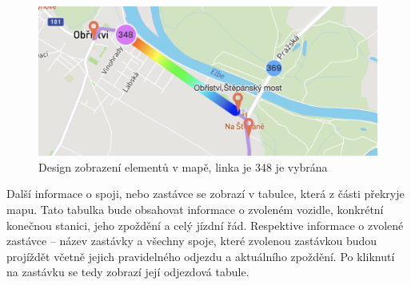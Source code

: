 \begin{figure}
\centering
  \includegraphics[width=0.5\linewidth]{../img/dve_vozidla.png}
  \caption{Design zobrazení elementů v mapě, linka je 348 je vybrána}
  \label{fig:dve_vozidla}
\end{figure}


Další informace o spoji, nebo zastávce se zobrazí v tabulce, která z části překryje mapu. Tato tabulka bude obsahovat informace o zvoleném vozidle, konkrétní konečnou stanici, jeho zpoždění a celý jízdní řád. Respektive informace o zvolené zastávce – název zastávky a všechny spoje, které zvolenou zastávkou budou projíždět včetně jejich pravidelného odjezdu a aktuálního zpoždění. Po kliknutí na zastávku se tedy zobrazí její odjezdová tabule.
